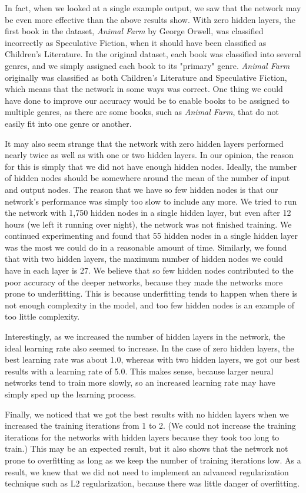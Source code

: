 \documentclass[11pt,letterpaper]{article}
\begin{document}
In fact, when we looked at a single example output, we saw that the network may be even more effective than the above results show. With zero hidden layers, the first book in the dataset, \emph{Animal Farm} by George Orwell, was classified incorrectly as Speculative Fiction, when it should have been classified as Children's Literature. In the original dataset, each book was classified into several genres, and we simply assigned each book to its "primary" genre. \emph{Animal Farm} originally was classified as both Children's Literature and Speculative Fiction, which means that the network in some ways was correct. One thing we could have done to improve our accuracy would be to enable books to be assigned to multiple genres, as there are some books, such as \emph{Animal Farm}, that do not easily fit into one genre or another.

It may also seem strange that the network with zero hidden layers performed nearly twice as well as with one or two hidden layers. In our opinion, the reason for this is simply that we did not have enough hidden nodes. Ideally, the number of hidden nodes should be somewhere around the mean of the number of input and output nodes. The reason that we have so few hidden nodes is that our network's performance was simply too slow to include any more. We tried to run the network with 1,750 hidden nodes in a single hidden layer, but even after 12 hours (we left it running over night), the network was not finished training. We continued experimenting and found that 55 hidden nodes in a single hidden layer was the most we could do in a reasonable amount of time. Similarly, we found that with two hidden layers, the maximum number of hidden nodes we could have in each layer is 27. We believe that so few hidden nodes contributed to the poor accuracy of the deeper networks, because they made the networks more prone to underfitting. This is because underfitting tends to happen when there is not enough complexity in the model, and too few hidden nodes is an example of too little complexity.

Interestingly, as we increased the number of hidden layers in the network, the ideal learning rate also seemed to increase. In the case of zero hidden layers, the best learning rate was about 1.0, whereas with two hidden layers, we got our best results with a learning rate of 5.0. This makes sense, because larger neural networks tend to train more slowly, so an increased learning rate may have simply sped up the learning process.

Finally, we noticed that we got the best results with no hidden layers when we increased the training iterations from 1 to 2. (We could not increase the training iterations for the networks with hidden layers because they took too long to train.) This may be an expected result, but it also shows that the network not prone to overfitting as long as we keep the number of training iterations low. As a result, we knew that we did not need to implement an advanced regularization technique such as L2 regularization, because there was little danger of overfitting.
\end{document}
